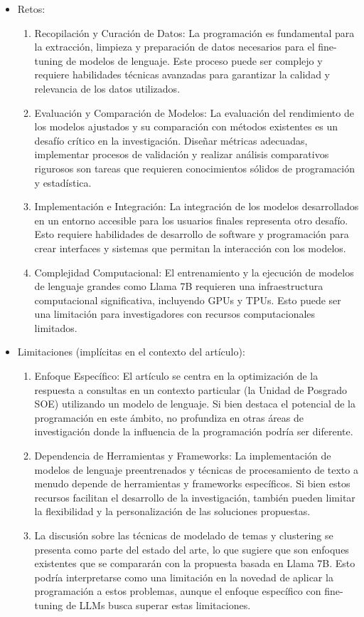 \documentclass[12pt,twocolumn]{article}
\begin{document}
\begin{itemize}
\begin{enumerate}
    \end{enumerate}
\item Retos:
    \begin{enumerate}
        \item Recopilación y Curación de Datos: La programación es fundamental para la extracción, limpieza y preparación de datos necesarios para el fine-tuning de modelos de lenguaje. 
        Este proceso puede ser complejo y requiere habilidades técnicas avanzadas para garantizar la calidad y relevancia de los datos utilizados.
        \item Evaluación y Comparación de Modelos: La evaluación del rendimiento de los modelos ajustados y su comparación con métodos existentes es un desafío crítico en la investigación. 
        Diseñar métricas adecuadas, implementar procesos de validación y realizar análisis comparativos rigurosos son tareas que requieren conocimientos sólidos de programación y estadística.
        \item Implementación e Integración: La integración de los modelos desarrollados en un entorno accesible para los usuarios finales representa otro desafío. 
        Esto requiere habilidades de desarrollo de software y programación para crear interfaces y sistemas que permitan la interacción con los modelos.
        \item Complejidad Computacional: El entrenamiento y la ejecución de modelos de lenguaje grandes como Llama 7B requieren una infraestructura computacional significativa, incluyendo GPUs y TPUs. 
        Esto puede ser una limitación para investigadores con recursos computacionales limitados.
    \end{enumerate} 
\item Limitaciones (implícitas en el contexto del artículo):
    \begin{enumerate}
    \item Enfoque Específico: El artículo se centra en la optimización de la respuesta a consultas en un contexto particular (la Unidad de Posgrado SOE) utilizando un modelo de lenguaje. Si bien destaca el potencial de la programación en este ámbito, no profundiza en otras áreas de investigación donde la influencia de la programación podría ser diferente.
    \item Dependencia de Herramientas y Frameworks: La implementación de modelos de lenguaje preentrenados y técnicas de procesamiento de texto a menudo depende de herramientas y frameworks específicos. 
    Si bien estos recursos facilitan el desarrollo de la investigación, también pueden limitar la flexibilidad y la personalización de las soluciones propuestas.
    \item La discusión sobre las técnicas de modelado de temas y clustering se presenta como parte del estado del arte, lo que sugiere que son enfoques existentes que se compararán con la propuesta basada en Llama 7B. 
    Esto podría interpretarse como una limitación en la novedad de aplicar la programación a estos problemas, aunque el enfoque específico con fine-tuning de LLMs busca superar estas limitaciones.
    \end{enumerate}
\end{itemize}
\end{document}
